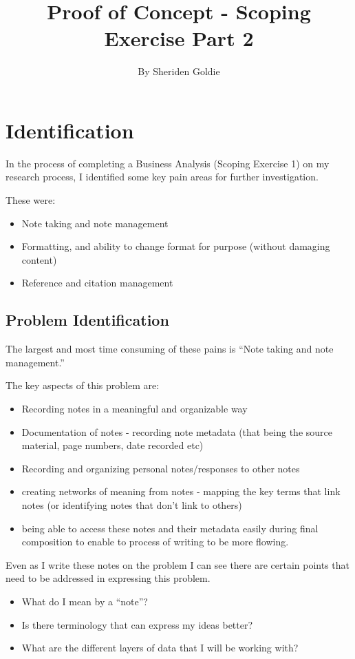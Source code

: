 \documentclass{article}
\title{Proof of Concept - Scoping Exercise Part 2}
\author{By Sheriden Goldie}
\date{}
\begin{document}
\maketitle

\tableofcontents

\pagebreak

\section{Identification}
In the process of completing a Business Analysis (Scoping Exercise 1) on my research process, I identified some key pain areas for further investigation.

These were:
\begin{itemize}
    \item Note taking and note management
    \item Formatting, and ability to change format for purpose (without damaging content)
    \item Reference and citation management
\end{itemize}

\subsection{Problem Identification}
The largest and most time consuming of these pains is ``Note taking and note management.''

The key aspects of this problem are:
\begin{itemize}
    \item Recording notes in a meaningful and organizable way
    \item Documentation of notes - recording note metadata (that being the source material, page numbers, date recorded etc)
    \item Recording and organizing personal notes/responses to other notes
    \item creating networks of meaning from notes - mapping the key terms that link notes (or identifying notes that don't link to others)
    \item being able to access these notes and their metadata easily during final composition to enable to process of writing to be more flowing.
\end{itemize}

Even as I write these notes on the problem I can see there are certain points that need to be addressed in expressing this problem. 
\begin{itemize}
    \item What do I mean by a ``note''?
    \item Is there terminology that can express my ideas better?
    \item What are the different layers of data that I will be working with?
\end{itemize}
\end{document}
